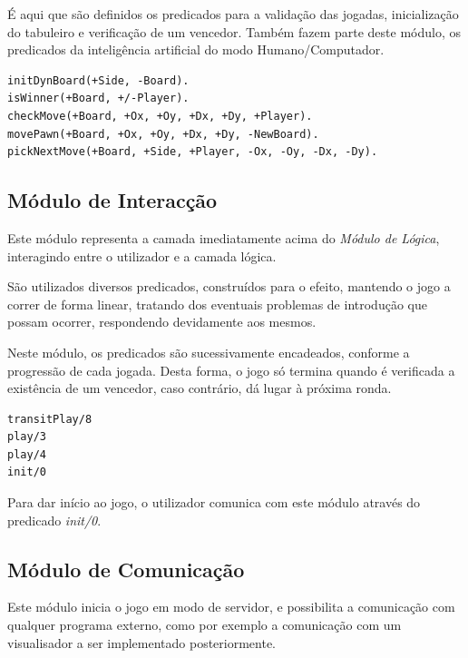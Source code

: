 \documentclass[15pt,a4paper]{article}
\begin{document}
É aqui que são definidos os predicados para a validação das jogadas, inicialização do tabuleiro e verificação de um vencedor. 
Também fazem parte deste módulo, os predicados da inteligência artificial do modo Humano/Computador.

\begin{lstlisting}
initDynBoard(+Side, -Board).
isWinner(+Board, +/-Player).
checkMove(+Board, +Ox, +Oy, +Dx, +Dy, +Player).
movePawn(+Board, +Ox, +Oy, +Dx, +Dy, -NewBoard).
pickNextMove(+Board, +Side, +Player, -Ox, -Oy, -Dx, -Dy).
\end{lstlisting}



\subsection{Módulo de Interacção}

Este módulo representa a camada imediatamente acima do \textit{Módulo de Lógica}, interagindo entre o utilizador e a camada lógica.

São utilizados diversos predicados, construídos para o efeito, mantendo o jogo a correr de forma linear, tratando dos eventuais problemas de introdução que possam ocorrer, respondendo devidamente aos mesmos.

Neste módulo, os predicados são sucessivamente encadeados, conforme a progressão de cada jogada. Desta forma, o jogo só termina quando é verificada a existência de um vencedor, caso contrário, dá lugar à
próxima ronda.

\begin{lstlisting}
transitPlay/8
play/3
play/4
init/0
\end{lstlisting}

Para dar início ao jogo, o utilizador comunica com este módulo através do predicado \textit{init/0}.


\subsection{Módulo de Comunicação}

Este módulo inicia o jogo em modo de servidor, e possibilita a comunicação com qualquer programa externo, como por exemplo a
comunicação com um visualisador a ser implementado posteriormente.
\end{document}
